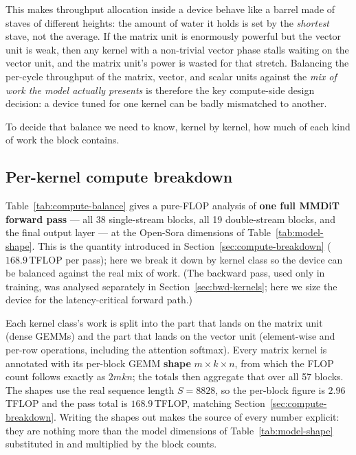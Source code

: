 \documentclass[11pt]{report}
\begin{document}
This makes throughput allocation inside a device behave like a barrel made
of staves of different heights: the amount of water it holds is set by the
\emph{shortest} stave, not the average. If the matrix unit is enormously
powerful but the vector unit is weak, then any kernel with a non-trivial
vector phase stalls waiting on the vector unit, and the matrix unit's power
is wasted for that stretch. Balancing the per-cycle throughput of the
matrix, vector, and scalar units against the \emph{mix of work the model
actually presents} is therefore the key compute-side design decision: a
device tuned for one kernel can be badly mismatched to another.

To decide that balance we need to know, kernel by kernel, how much of each
kind of work the block contains.

\subsection{Per-kernel compute breakdown}

Table~\ref{tab:compute-balance} gives a pure-FLOP analysis of \textbf{one
full MMDiT forward pass} --- all 38 single-stream blocks, all 19
double-stream blocks, and the final output layer --- at the Open-Sora
dimensions of Table~\ref{tab:model-shape}. This is the quantity introduced
in Section~\ref{sec:compute-breakdown} ($168.9$\,TFLOP per pass); here we
break it down by kernel class so the device can be balanced against the
real mix of work. (The backward pass, used only in training, was analysed
separately in Section~\ref{sec:bwd-kernels}; here we size the device for the
latency-critical forward path.)

Each kernel class's work is split into the part that lands on the matrix
unit (dense GEMMs) and the part that lands on the vector unit (element-wise
and per-row operations, including the attention softmax). Every matrix
kernel is annotated with its per-block GEMM \textbf{shape}
$m\times k\times n$, from which the FLOP count follows exactly as $2mkn$;
the totals then aggregate that over all 57 blocks. The shapes use the real
sequence length $S=8828$, so the per-block figure is $2.96$\,TFLOP and the
pass total is $168.9$\,TFLOP, matching Section~\ref{sec:compute-breakdown}.
Writing the shapes out makes the source of every number explicit: they are
nothing more than the model dimensions of Table~\ref{tab:model-shape}
substituted in and multiplied by the block counts.
\end{document}
